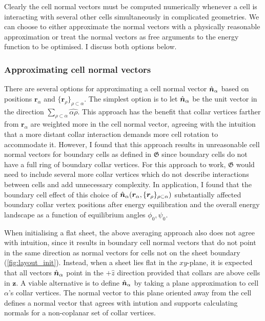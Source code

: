 Clearly the cell normal vectors must be computed numerically whenever a cell is interacting with several other cells simultaneously in complicated geometries. 
We can choose to either approximate the normal vectors with a physically reasonable approximation or treat the normal vectors as free arguments to the energy function to be optimised.
I discuss both options below. 

\subsubsection{Approximating cell normal vectors} \label{subsubsec:approx_norm}

There are several options for approximating a cell normal vector $\hat{\bm{n}}_\alpha$ based on positions $\bm{r}_\alpha$ and $\{ \bm{r}_\rho\}_{\rho\subset\alpha}$. The simplest option is to let $\hat{\bm{n}}_\alpha$ be the unit vector in the direction $\sum_{\rho\subset\alpha}\hat{\alpha\rho}$. 
This approach has the benefit that collar vertices farther from $\bm{r}_\alpha$ are weighted more in the cell normal vector, agreeing with the intuition that a more distant collar interaction demands more cell rotation to accommodate it. 
However, I found that this approach results in unreasonable cell normal vectors for boundary cells as defined in $\mathfrak{G}$ since boundary cells do not have a full ring of boundary collar vertices. 
For this approach to work, $\mathfrak{G}$ would need to include several more collar vertices which do not describe interactions between cells and add unnecessary complexity.
In application, I found that the boundary cell effect of this choice of $\hat{\bm{n}}_\alpha(\bm{r}_\alpha, \{\bm{r}_\rho\}_{\rho\subset\alpha})$ substantially affected boundary collar vertex positions after energy equilibration and the overall energy landscape as a function of equilibrium angles $\phi_0, \psi_0$. 

When initialising a flat sheet, the above averaging approach also does not agree with intuition, since it results in boundary cell normal vectors that do not point in the same direction as normal vectors for cells not on the sheet boundary (\cref{fig:layout_init}). Instead, when a sheet lies flat in the $xy$-plane, it is expected that all vectors $\hat{\bm{n}}_\alpha$ point in the $+\hat{z}$ direction provided that collars are above cells in $\bm{z}$. 
A viable alternative is to define $\hat{\bm{n}}_\alpha$ by taking a plane approximation to cell $\alpha$'s collar vertices. 
The normal vector to this plane oriented away from the cell defines a normal vector that agrees with intution and supports calculating normals for a non-coplanar set of collar vertices.

